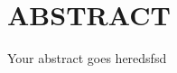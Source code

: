 \chapter*{ABSTRACT}
Your abstract goes heredsfsd \parencites[p.~500]{Ehnert2016}[pp.~100--200]{Waas2021}